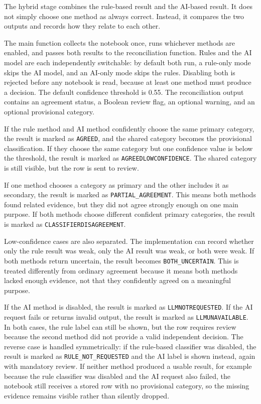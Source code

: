The hybrid stage combines the rule-based result and the AI-based result. It does not simply choose one method as always correct. Instead, it compares the two outputs and records how they relate to each other.

The main function collects the notebook once, runs whichever methods are enabled, and passes both results to the reconciliation function. Rules and the AI model are each independently switchable: by default both run, a rule-only mode skips the AI model, and an AI-only mode skips the rules. Disabling both is rejected before any notebook is read, because at least one method must produce a decision. The default confidence threshold is 0.55. The reconciliation output contains an agreement status, a Boolean review flag, an optional warning, and an optional provisional category.

If the rule method and AI method confidently choose the same primary category, the result is marked as \texttt{AGREED}, and the shared category becomes the provisional classification. If they choose the same category but one confidence value is below the threshold, the result is marked as \texttt{AGREED\ub LOW\ub CONFIDENCE}. The shared category is still visible, but the row is sent to review.

If one method chooses a category as primary and the other includes it as secondary, the result is marked as \texttt{PARTIAL\_AGREEMENT}. This means both methods found related evidence, but they did not agree strongly enough on one main purpose. If both methods choose different confident primary categories, the result is marked as \texttt{CLASSIFIER\ub DISAGREEMENT}.

Low-confidence cases are also separated. The implementation can record whether only the rule result was weak, only the AI result was weak, or both were weak. If both methods return uncertain, the result becomes \texttt{BOTH\_UNCERTAIN}. This is treated differently from ordinary agreement because it means both methods lacked enough evidence, not that they confidently agreed on a meaningful purpose.

If the AI method is disabled, the result is marked as \texttt{LLM\ub NOT\ub REQUESTED}. If the AI request fails or returns invalid output, the result is marked as \texttt{LLM\ub UNAVAILABLE}. In both cases, the rule label can still be shown, but the row requires review because the second method did not provide a valid independent decision. The reverse case is handled symmetrically: if the rule-based classifier was disabled, the result is marked as \texttt{RULE\_NOT\_REQUESTED} and the AI label is shown instead, again with mandatory review. If neither method produced a usable result, for example because the rule classifier was disabled and the AI request also failed, the notebook still receives a stored row with no provisional category, so the missing evidence remains visible rather than silently dropped.

